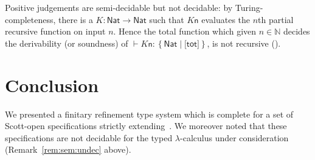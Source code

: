 \documentclass[%
  a4paper,
  UKenglish,
  cleveref,
  autoref,
  thm-restate,
  numberwithinsect,
]{lipics-v2021}
\newcommand\thesis{\vdash}
\newcommand\NN{\mathbb{N}}
\newcommand\term[1]{\mathsf{#1}}
\newcommand\type[1]{\term{#1}}
\newcommand\arrow\to
\newcommand\Nat{\type{Nat}}
\newcommand\reft[1]{\left\{ #1 \right\}}
\newcommand\tot{\term{tot}}
\newcommand\form[1]{\lbrack #1 \rbrack}
\begin{document}


\begin{remark}[Undecidability]
\label{rem:sem:undec}
Positive judgements are semi-decidable but not decidable:
by Turing-completeness,
there is a $K \colon \Nat \arrow \Nat$
such that $K \term n$ evaluates the $n$th partial recursive function on input $n$.
Hence the total function which given $n \in \NN$
decides the derivability (or soundness)
of $\thesis K \term n \colon \reft{\Nat \mid \form{\tot}}$,
is not recursive
(\cite[Theorem II.2.3]{odifreddi99book}).
\lipicsEnd
\end{remark}


\section{Conclusion}
\label{sec:conc}

We presented a finitary refinement type system which is
complete for a set of Scott-open specifications 
strictly extending~\cite{abramsky87lics,abramsky91apal}.
We moreover noted that these specifications are not decidable 
for the typed $\lambda$-calculus under consideration (Remark~\ref{rem:sem:undec} above).
\end{document}
